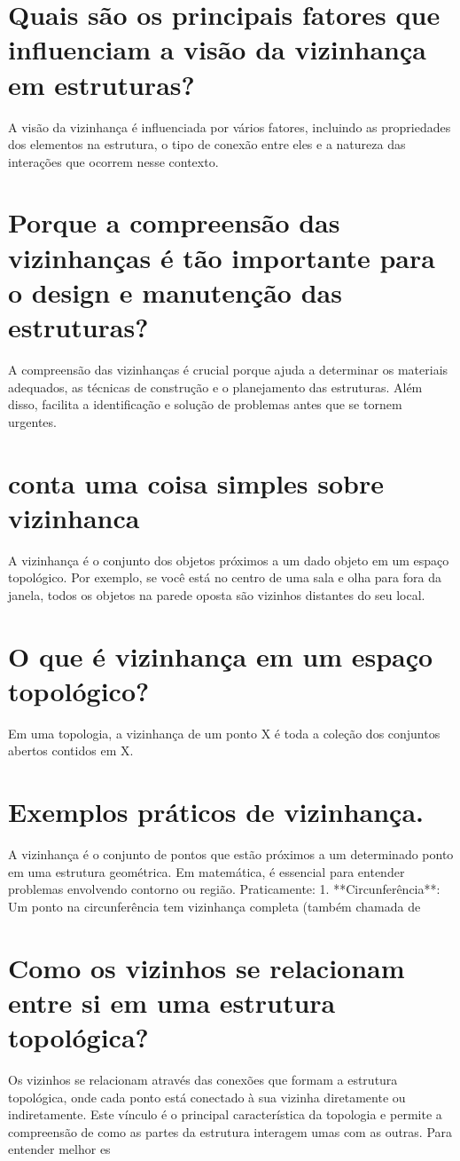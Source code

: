 \documentclass[11pt,a4paper]{article}
\begin{document}
\section{Quais são os principais fatores que influenciam a visão da vizinhança em estruturas?}
A visão da vizinhança é influenciada por vários fatores, incluindo as propriedades dos elementos na estrutura, o tipo de conexão entre eles e a natureza das interações que ocorrem nesse contexto.

\section{Porque a compreensão das vizinhanças é tão importante para o design e manutenção das estruturas?}
A compreensão das vizinhanças é crucial porque ajuda a determinar os materiais adequados, as técnicas de construção e o planejamento das estruturas. Além disso, facilita a identificação e solução de problemas antes que se tornem urgentes.

\section{conta uma coisa simples sobre vizinhanca}
A vizinhança é o conjunto dos objetos próximos a um dado objeto em um espaço topológico. Por exemplo, se você está no centro de uma sala e olha para fora da janela, todos os objetos na parede oposta são vizinhos distantes do seu local.

\section{O que é vizinhança em um espaço topológico?}
Em uma topologia, a vizinhança de um ponto X é toda a coleção dos conjuntos abertos contidos em X.

\section{Exemplos práticos de vizinhança.}
A vizinhança é o conjunto de pontos que estão próximos a um determinado ponto em uma estrutura geométrica. Em matemática, é essencial para entender problemas envolvendo contorno ou região. Praticamente: 1. **Circunferência**: Um ponto na circunferência tem vizinhança completa (também chamada de

\section{Como os vizinhos se relacionam entre si em uma estrutura topológica?}
Os vizinhos se relacionam através das conexões que formam a estrutura topológica, onde cada ponto está conectado à sua vizinha diretamente ou indiretamente. Este vínculo é o principal característica da topologia e permite a compreensão de como as partes da estrutura interagem umas com as outras. Para entender melhor es
\end{document}
